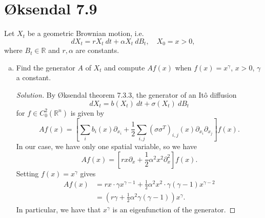 \documentclass[11pt,letterpaper]{report}
\newcommand{\reals}{\mathbb{R}}
\theoremstyle{definition}
\newenvironment{solution}
{\begin{proof}[Solution]}
{\end{proof}}
\begin{document}
\section*{\O ksendal 7.9}
Let $X_t$ be a geometric Brownian motion, i.e.
\[
dX_t = rX_t\ dt + \alpha X_t\ dB_t,\quad X_0 = x>0,
\]
where $B_t\in \reals$ and $r,\alpha$ are constants.
\begin{enumerate}[(a)]
	\item Find the generator $A$ of $X_t$ and compute $Af(x)$ when $f(x) = x^\gamma$, $x>0$, $\gamma$ a constant.
	\begin{solution}
		By \O ksendal theorem 7.3.3, the generator of an It\^o diffusion
		\[
		dX_t = b(X_t)\ dt + \sigma(X_t)\ dB_t
		\]
		for $f\in C_0^2(\reals^n)$ is given by
		\[
		Af(x) = \left[ \sum_i b_i(x)\partial_{x_i}+ \frac{1}{2}\sum_{i,j}(\sigma\sigma^T)_{i,j}(x)\partial_{x_i}\partial_{x_j}\right]f(x).
		\]
		In our case, we have only one spatial variable, so we have
		\[
		Af(x) = \left[rx\partial_x + \frac{1}{2}\alpha^2x^2\partial^2_{x}\right]f(x).
		\]
		Setting $f(x) = x^\gamma$ gives
		\begin{align*}
			Af(x) &= rx\cdot \gamma x^{\gamma-1} + \frac{1}{2}\alpha^2x^2\cdot \gamma(\gamma-1)x^{\gamma-2}\\
			&= \left(r\gamma + \frac{1}{2}\alpha^2\gamma(\gamma-1)\right)x^\gamma.
		\end{align*}
		In particular, we have that $x^\gamma$ is an eigenfunction of the generator.
	\end{solution}


\end{enumerate}
\end{document}
